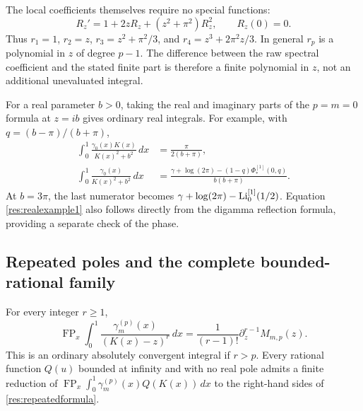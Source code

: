 The local coefficients themselves require no special functions:
\begin{equation}\label{res:riccati}
 R_z'=1+2zR_z+(z^2+\pi^2)R_z^2,\qquad R_z(0)=0.
\end{equation}
Thus $r_1=1$, $r_2=z$, $r_3=z^2+\pi^2/3$, and
$r_4=z^3+2\pi^2z/3$. In general $r_p$ is a polynomial in $z$
of degree $p-1$. The difference between the raw spectral coefficient
and the stated finite part is therefore a finite polynomial in $z$,
not an additional unevaluated integral.

For a real parameter $b>0$, taking the real and imaginary parts of
the $p=m=0$ formula at $z=ib$ gives ordinary real integrals. For example,
with $q=(b-\pi)/(b+\pi)$,
\begin{align}
 \int_0^1\frac{\gamma_0(x)K(x)}{K(x)^2+b^2}\,dx
       &=\frac{\pi}{2(b+\pi)},\label{res:realexample1}\\
 \int_0^1\frac{\gamma_0(x)}{K(x)^2+b^2}\,dx
       &=\frac{\gamma+\log(2\pi)
                   -(1-q)\Phi_*^{[1]}(0,q)}{b(b+\pi)}.
       \label{res:realexample2}
\end{align}
At $b=3\pi$, the last numerator becomes
$\gamma+\log(2\pi)-\operatorname{Li}_0^{[1]}(1/2)$.
Equation \eqref{res:realexample1} also follows directly from the
digamma reflection formula, providing a separate check of the phase.

\subsection{Repeated poles and the complete bounded-rational family}

\begin{corollary}\label{res:repeated}
For every integer $r\ge1$,
\begin{equation}\label{res:repeatedformula}
 \operatorname{FP}_x\int_0^1
       \frac{\gamma_m^{(p)}(x)}{(K(x)-z)^r}\,dx
       =\frac1{(r-1)!}\partial_z^{r-1}M_{m,p}(z).
\end{equation}
This is an ordinary absolutely convergent integral if $r>p$.
Every rational function $Q(u)$ bounded at infinity and with no real pole admits
a finite reduction of
$\operatorname{FP}_x\int_0^1\gamma_m^{(p)}(x)Q(K(x))\,dx$
to the right-hand sides of \eqref{res:repeatedformula}.
\end{corollary}

